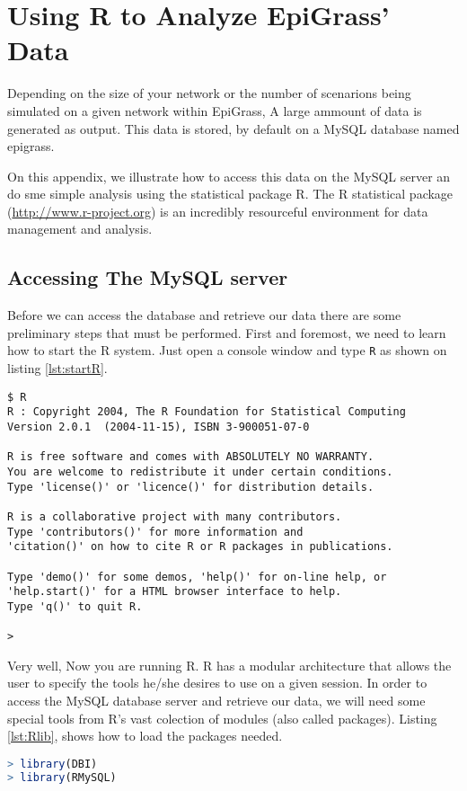 \chapter{Using R to Analyze EpiGrass' Data}\label{cap:introR} 
Depending on the size of your network or the number of scenarions being simulated on a given network within EpiGrass, A large ammount of data is generated as output. This data is stored, by default on a MySQL database named epigrass.

On this appendix, we illustrate how to access this data on the MySQL server an do sme simple analysis using the statistical package R. The R statistical package (\url{http://www.r-project.org}) is an incredibly resourceful environment for data management and analysis. 

\section{Accessing The MySQL server}
Before we can access the database and retrieve our data there are some preliminary steps that must be performed. First and foremost, we need to learn how to start the R system. Just open a console window and type \texttt{R} as shown on listing \ref{lst:startR}.
\begin{lstlisting}[language=Ksh,basicstyle=\footnotesize,frame=trBL, caption=Starting R ,label=lst:startR]
$ R
R : Copyright 2004, The R Foundation for Statistical Computing
Version 2.0.1  (2004-11-15), ISBN 3-900051-07-0

R is free software and comes with ABSOLUTELY NO WARRANTY.
You are welcome to redistribute it under certain conditions.
Type 'license()' or 'licence()' for distribution details.

R is a collaborative project with many contributors.
Type 'contributors()' for more information and
'citation()' on how to cite R or R packages in publications.

Type 'demo()' for some demos, 'help()' for on-line help, or
'help.start()' for a HTML browser interface to help.
Type 'q()' to quit R.

>                       
\end{lstlisting}

Very well, Now you are running R. R has a modular architecture that allows the user to specify the tools he/she desires to use on a given session. In order to access the MySQL database server and retrieve our data, we will need some special tools from R's vast colection of modules (also called packages). Listing \ref{lst:Rlib}, shows how to load the packages needed.
\begin{lstlisting}[language=R,basicstyle=\footnotesize,frame=trBL, caption=Loading required packages.,label=lst:Rlib]
> library(DBI)
> library(RMySQL)
\end{lstlisting}

